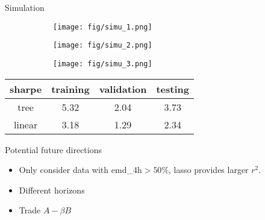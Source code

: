 \documentclass[9pt]{beamer}
\begin{document}
\begin{frame}{Simulation}


\begin{figure}[h!]
    \centering
    \begin{subfigure}[b]{0.32\textwidth}
        \centering
        \texttt{[image: fig/simu\_1.png]}
        \label{fig:figure1}
    \end{subfigure}
    \begin{subfigure}[b]{0.32\textwidth}
        \centering
        \texttt{[image: fig/simu\_2.png]}
        \label{fig:figure2}
    \end{subfigure}
    \begin{subfigure}[b]{0.32\textwidth}
        \centering
        \texttt{[image: fig/simu\_3.png]}
        \label{fig:figure3}
    \end{subfigure}
    \label{fig:three_figures}
\end{figure}


\begin{table}[h!]
\centering
\begin{tabular}{c|c|c|c}
\hline
sharpe & \textbf{training} & \textbf{validation} & \textbf{testing} \\ \hline
tree      & 5.32      & 2.04    & 3.73      \\ \hline
linear     & 3.18      & 1.29      & 2.34     \\ \hline
\end{tabular}
\end{table}


\end{frame}



\begin{frame}{Potential future directions}



\begin{itemize}
    \item Only consider data with emd\_4h$>50\%$, lasso provides larger $r^2$.
    \item Different horizons
    \item Trade $A-\beta B$
\end{itemize}

\end{frame}
\end{document}

